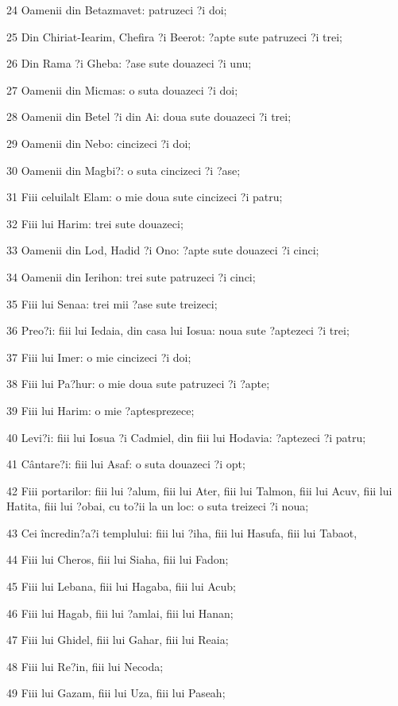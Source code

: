 \par 24 Oamenii din Betazmavet: patruzeci ?i doi;
\par 25 Din Chiriat-Iearim, Chefira ?i Beerot: ?apte sute patruzeci ?i trei;
\par 26 Din Rama ?i Gheba: ?ase sute douazeci ?i unu;
\par 27 Oamenii din Micmas: o suta douazeci ?i doi;
\par 28 Oamenii din Betel ?i din Ai: doua sute douazeci ?i trei;
\par 29 Oamenii din Nebo: cincizeci ?i doi;
\par 30 Oamenii din Magbi?: o suta cincizeci ?i ?ase;
\par 31 Fiii celuilalt Elam: o mie doua sute cincizeci ?i patru;
\par 32 Fiii lui Harim: trei sute douazeci;
\par 33 Oamenii din Lod, Hadid ?i Ono: ?apte sute douazeci ?i cinci;
\par 34 Oamenii din Ierihon: trei sute patruzeci ?i cinci;
\par 35 Fiii lui Senaa: trei mii ?ase sute treizeci;
\par 36 Preo?i: fiii lui Iedaia, din casa lui Iosua: noua sute ?aptezeci ?i trei;
\par 37 Fiii lui Imer: o mie cincizeci ?i doi;
\par 38 Fiii lui Pa?hur: o mie doua sute patruzeci ?i ?apte;
\par 39 Fiii lui Harim: o mie ?aptesprezece;
\par 40 Levi?i: fiii lui Iosua ?i Cadmiel, din fiii lui Hodavia: ?aptezeci ?i patru;
\par 41 Cântare?i: fiii lui Asaf: o suta douazeci ?i opt;
\par 42 Fiii portarilor: fiii lui ?alum, fiii lui Ater, fiii lui Talmon, fiii lui Acuv, fiii lui Hatita, fiii lui ?obai, cu to?ii la un loc: o suta treizeci ?i noua;
\par 43 Cei încredin?a?i templului: fiii lui ?iha, fiii lui Hasufa, fiii lui Tabaot,
\par 44 Fiii lui Cheros, fiii lui Siaha, fiii lui Fadon;
\par 45 Fiii lui Lebana, fiii lui Hagaba, fiii lui Acub;
\par 46 Fiii lui Hagab, fiii lui ?amlai, fiii lui Hanan;
\par 47 Fiii lui Ghidel, fiii lui Gahar, fiii lui Reaia;
\par 48 Fiii lui Re?in, fiii lui Necoda;
\par 49 Fiii lui Gazam, fiii lui Uza, fiii lui Paseah;
